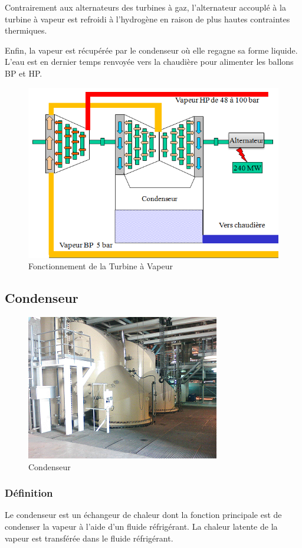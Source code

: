 Contrairement aux alternateurs des turbines à gaz, l'alternateur accouplé à la turbine à vapeur est refroidi à l'hydrogène en raison de plus hautes contraintes thermiques.

Enfin, la vapeur est récupérée par le condenseur où elle regagne sa forme liquide. L'eau est en dernier temps renvoyée vers la chaudière pour alimenter les ballons BP et HP. 
\begin{figure}[hbtp]
\centering
\includegraphics[scale=0.8]{./Figures/echange_tv.png}
\caption{Fonctionnement de la Turbine à Vapeur}
\end{figure}
\subsection{Condenseur}
\begin{figure}[hbtp]
\centering
\includegraphics[scale=0.9]{./Figures/condenseur.png}
\caption{Condenseur}

\end{figure}
\subsubsection{Définition}
Le condenseur est un échangeur de chaleur dont la fonction principale est de condenser la vapeur à l'aide d'un fluide réfrigérant. La chaleur latente de la vapeur est transférée dans le fluide réfrigérant.

